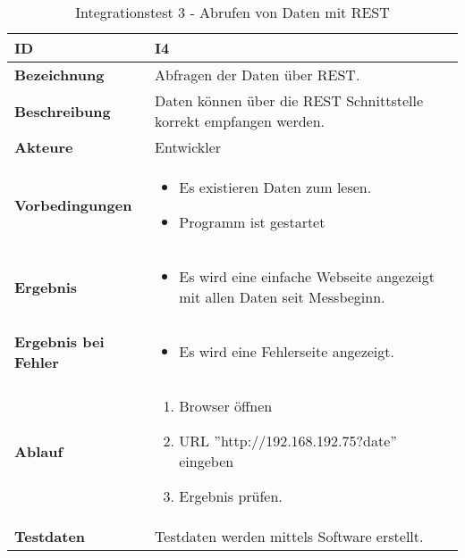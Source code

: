 \begin{table}[H]
    \begin{tabularx}{\textwidth}{ | p{} | p{} |} \hline
        \rowcolor{gray!50}
        \textbf{ID} & \textbf{I4}\\ \hline
        \textbf{Bezeichnung} & 
        Abfragen der Daten über REST.\\ \hline
        \textbf{Beschreibung} & 
        Daten können über die REST Schnittstelle korrekt empfangen werden.\\ \hline
        \textbf{Akteure} &
        Entwickler\\ \hline
        \textbf{Vorbedingungen} &
        \begin{itemize}
            \item Es existieren Daten zum lesen.
            \item Programm ist gestartet
        \end{itemize}\\ \hline
        \textbf{Ergebnis} &        
        \begin{itemize}
            \item Es wird eine einfache Webseite angezeigt mit allen Daten seit Messbeginn.
        \end{itemize}\\ \hline
        \textbf{Ergebnis bei Fehler} &
        \begin{itemize}
            \item Es wird eine Fehlerseite angezeigt.
        \end{itemize}\\ \hline
        \textbf{Ablauf} &
        \begin{enumerate}
            \item Browser öffnen
            \item URL ''http://192.168.192.75?date'' eingeben
            \item Ergebnis prüfen.
        \end{enumerate}\\ \hline
        \textbf{Testdaten} &
        Testdaten werden mittels Software erstellt.\\ \hline
    \end{tabularx}
    \caption{Integrationstest 3 - Abrufen von Daten mit REST}
    \label{tab:inttest4}
\end{table}

\renewcommand{\labelitemi}{$\bullet$}